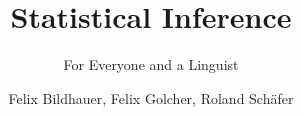 \author{Felix Bildhauer, Felix Golcher, Roland Schäfer}
\title{Statistical Inference}
\subtitle{For Everyone and a Linguist}
\renewcommand{\lsSeries}{tbls}
\renewcommand{\lsSeriesNumber}{}


\def\lsBookDOI{}
\def\lsISBNhardcover{}
\def\lsISBNsoftcover{}
\def\lsISBNdigital{}
\def\lsID{}
